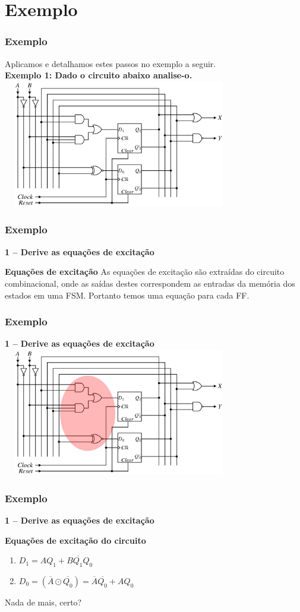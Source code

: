 \documentclass{beamer}
\begin{document}
\section{Exemplo}
\begin{frame}
  \frametitle{Exemplo}
  Aplicamos e detalhamos estes passos no exemplo a seguir.\\
  
  \textbf{Exemplo 1: Dado o circuito abaixo analise-o.}
   \includegraphics[height = 2.2in, width = 4in]{EXEMPLO_ANALISE_1.png}
\end{frame}

\begin{frame}
  \frametitle{Exemplo}
  \textbf{1 – Derive as equações de excitação}
  \begin{block}{\textbf{Equações de excitação}}
   As equações de excitação são extraídas do circuito combinacional, onde as saídas destes correspondem as entradas da memória dos estados em uma FSM. 
   Portanto temos uma equação para cada FF.
  \end{block}
\end{frame}

\begin{frame}
  \frametitle{Exemplo}
  \textbf{1 – Derive as equações de excitação}
   \includegraphics[height = 2.2in, width = 4in]{EXEMPLO_ANALISE_2.png}
\end{frame}

\begin{frame}
  \frametitle{Exemplo}
  \textbf{1 – Derive as equações de excitação}
  \begin{block}{\textbf{Equações de excitação do circuito}}
    \begin{enumerate}
     \item $ D_1 = AQ_1 + B\overline{Q_1}Q_0 $
     \item $ D_0 = (\overline{A}\odot\overline{Q_0}) = \overline{A}\overline{Q_0} + AQ_0 $
    \end{enumerate}
  \end{block}\pause
  Nada de mais, certo?
\end{frame}
\end{document}
